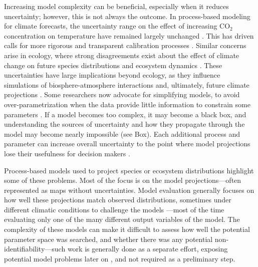 \documentclass[11pt]{article}
\begin{document}
Increasing model complexity can be beneficial, especially when it reduces uncertainty; however, this is not always the outcome. In process-based modeling for climate forecasts, the uncertainty range on the effect of increasing CO$_{2}$ concentration on temperature have remained largely unchanged \citep{Zelinka2020}. This has driven calls for more rigorous and transparent calibration processes \citep{balaji2022general}. Similar concerns arise in ecology, where strong disagreements exist about the effect of climate change on future species distributions \citep{Cheaib2012} and ecosystem dynamics \citep{Lovenduski2017}.
These uncertainties have large implications beyond ecology, as they influence simulations of biosphere-atmosphere interactions and, ultimately, future climate projections \citep{Bonan2018, simpson2025confronting}.
Some researchers now advocate for simplifying models, to avoid over-parametrization when the data provide little information to constrain some parameters \citep{Wang2017, Harrison2021}. 
If a model becomes too complex, it may become a black box,
and understanding the sources of uncertainty and how they propagate through the model may become nearly impossible (see Box).
Each additional process and parameter can increase overall uncertainty to the point where model projections lose their usefulness for decision makers \citep{Saltelli2020}. 

Process-based models used to project species or ecosystem distributions highlight some of these problems. Most of the focus is on the model projections---often represented as maps without uncertainties. Model evaluation generally focuses on how well these projections match observed distributions, sometimes under different climatic conditions to challenge the models \citep{VanderMeersch2025a}---most of the time evaluating only one of the many different output variables of the model.
The complexity of these models can make it difficult to assess how well the potential parameter space was searched, and whether there was any potential non-identifiability---such work is generally done as a separate effort, exposing potential model problems later on \citep{VanderMeersch2025b}, and not required as a preliminary step. 
\end{document}
